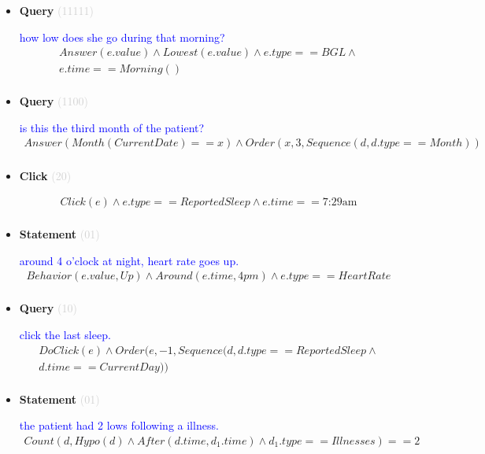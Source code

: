 \documentclass[11pt]{article}
\newcommand{\key}[1]{\textcolor{lightgray}{#1}}
\newcounter{CQuery}
\newcounter{CStatement}
\newcounter{CClick}
\begin{document}
\begin{itemize}
\item
\textbf{Query\theCQuery} \key{(11111)} \addtocounter{CQuery}{1}
\textcolor{blue}{ how low does she go during that morning? }
\begin{multline*}
Answer(e.value) \wedge Lowest(e.value) \wedge e.type==BGL \wedge \\ 
e.time==Morning() \\ 
\end{multline*}


\item
\textbf{Query\theCQuery} \key{(1100)} \addtocounter{CQuery}{1}
\textcolor{blue}{ is this the third month of the patient? }
\begin{multline*}
Answer(Month(CurrentDate)==x) \wedge Order(x, 3, Sequence(d, d.type==Month)) \\ 
\end{multline*}


\item
\textbf{Click\theCClick} \key{(20)} \addtocounter{CClick}{1}
\textcolor{blue}{  }
\begin{multline*}
Click(e) \wedge e.type==ReportedSleep \wedge e.time==\mbox{7:29am} \\ 
\end{multline*}


\item
\textbf{Statement\theCStatement} \key{(01)} \addtocounter{CStatement}{1}
\textcolor{blue}{ around 4 o'clock at night, heart rate goes up. }
\begin{multline*}
Behavior(e.value, Up) \wedge Around(e.time, 4pm) \wedge e.type==HeartRate \\ 
\end{multline*}


\item
\textbf{Query\theCQuery} \key{(10)} \addtocounter{CQuery}{1}
\textcolor{blue}{ click the last sleep. }
\begin{multline*}
DoClick(e) \wedge  Order(e, -1, Sequence(d, d.type==ReportedSleep \wedge \\ 
d.time==CurrentDay)) \\ 
\end{multline*}


\item
\textbf{Statement\theCStatement} \key{(01)} \addtocounter{CStatement}{1}
\textcolor{blue}{ the patient had 2 lows following a illness. }
\begin{multline*}
Count(d, Hypo(d) \wedge After(d.time, d_1.time) \wedge d_1.type==Illnesses)==2 \\ 
\end{multline*}



\end{itemize}
\end{document}
